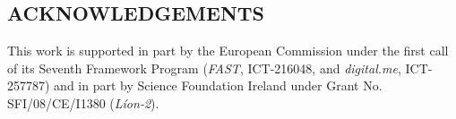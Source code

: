 \documentclass[a4paper,twoside]{article}
\begin{document}
\onecolumn \maketitle \normalsize \vfill













\begin{small}
\section*{ACKNOWLEDGEMENTS} This work is supported in part by the European Commission under the first call of its Seventh Framework Program (\emph{FAST}, ICT-216048, and \emph{digital.me}, ICT-257787) and in part by Science Foundation Ireland under Grant No. SFI/08/CE/I1380 (\emph{L\'ion-2}).
\end{small}

\renewcommand{\baselinestretch}{0.98}

{\small
}
\renewcommand{\baselinestretch}{1}
\end{document}
